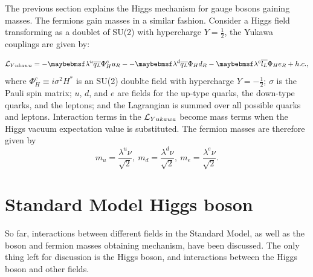 The previous section explains the Higgs mechanism for gauge bosons gaining masses. The fermions gain masses in a similar fashion. Consider a Higgs field transforming as a doublet of SU(2) with hypercharge $Y = \frac{1}{2}$, the Yukawa couplings are given by:

\begin{equation}
\Lagr_{Yukawa} = -\lambda^{u}\overline{q_L}\Phi_H^{c}u_R - -\lambda^{d}\overline{q_L}\Phi_H{d}_R - \lambda^{e}\overline{l_L}\Phi_{H}e_R + h.c. ,
\end{equation}
where $\Phi_H^{c} \equiv i \sigma^2H^*$ is an SU(2) doublte field with hypercharge $Y = -\frac{1}{2}$; $\sigma$ is the Pauli spin matrix; $u$, $d$, and $e$ are fields for the up-type quarks, the down-type quarks, and the leptons; and the Lagrangian is summed over all possible quarks and leptons. Interaction terms in the $\operatorname{\mathcal{L}}_{Yukawa}$ become mass terms when the Higgs vacuum expectation value is substituted. The fermion masses are therefore given by
\begin{equation}
m_{u} = \frac{\lambda^u{\nu}}{\sqrt{2}},\ m_{d} = \frac{\lambda^d{\nu}}{\sqrt{2}},\ m_{e} = \frac{\lambda^e{\nu}}{\sqrt{2}}.
\end{equation}

\section{Standard Model Higgs boson}
\label{sec:theoryHiggsBoson}

So far, interactions between different fields in the Standard Model, as well as the boson and fermion masses obtaining mechanism, have been discussed. The only thing left for discussion is the Higgs boson, and  interactions between the Higgs boson and other fields.

